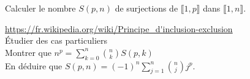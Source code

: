 \begin{exercice}
    Calculer le nombre $S(p,n)$ de surjections de $\llbracket 1, p \rrbracket$ dans $\llbracket 1, n \rrbracket$. \\
\end{exercice}


\begin{elem_sol}
    \url{https://fr.wikipedia.org/wiki/Principe_d'inclusion-exclusion} \\
    Étudier des cas particuliers \\
    Montrer que $n^p = \sum\limits_{k=0}^{n} \binom{n}{k} S(p,k)$ \\
    En déduire que $S(p,n) = (-1)^n \sum\limits_{j=1}^{n} \binom{n}{j} j^p$.
\end{elem_sol}